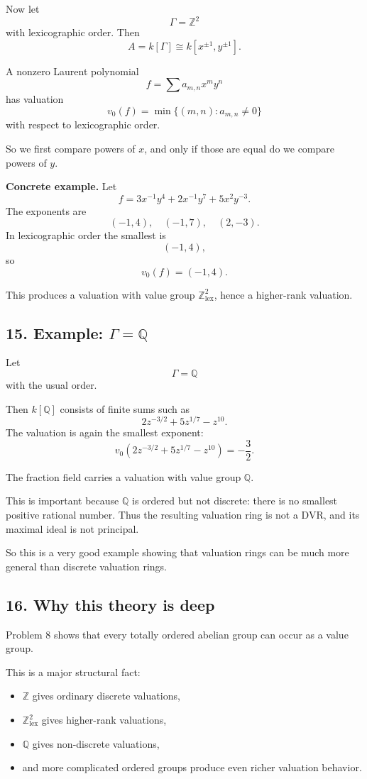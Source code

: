 \documentclass[12pt,a4paper]{article}
\theoremstyle{notespace}
\begin{document}
Now let
\[
\Gamma=\mathbb Z^2
\]
with lexicographic order. Then
\[
A=k[\Gamma]\cong k[x^{\pm1},y^{\pm1}].
\]

A nonzero Laurent polynomial
\[
f=\sum a_{m,n}x^m y^n
\]
has valuation
\[
v_0(f)=\min\{(m,n): a_{m,n}\neq 0\}
\]
with respect to lexicographic order.

So we first compare powers of \(x\), and only if those are equal do we compare powers of \(y\).

\textbf{Concrete example.}
Let
\[
f=3x^{-1}y^4 + 2x^{-1}y^7 + 5x^2y^{-3}.
\]
The exponents are
\[
(-1,4),\quad (-1,7),\quad (2,-3).
\]
In lexicographic order the smallest is
\[
(-1,4),
\]
so
\[
v_0(f)=(-1,4).
\]

This produces a valuation with value group \(\mathbb Z^2_{\mathrm{lex}}\), hence a higher-rank valuation.

\subsection{15. Example: \(\Gamma=\mathbb Q\)}

Let
\[
\Gamma=\mathbb Q
\]
with the usual order.

Then \(k[\mathbb Q]\) consists of finite sums such as
\[
2z^{-3/2}+5z^{1/7}-z^{10}.
\]
The valuation is again the smallest exponent:
\[
v_0\!\left(2z^{-3/2}+5z^{1/7}-z^{10}\right)=-\frac32.
\]

The fraction field carries a valuation with value group \(\mathbb Q\).

This is important because \(\mathbb Q\) is ordered but not discrete: there is no smallest positive rational number. Thus the resulting valuation ring is not a DVR, and its maximal ideal is not principal.

So this is a very good example showing that valuation rings can be much more general than discrete valuation rings.

\subsection{16. Why this theory is deep}

Problem 8 shows that every totally ordered abelian group can occur as a value group.

This is a major structural fact:
\begin{itemize}
	\item \(\mathbb Z\) gives ordinary discrete valuations,
	\item \(\mathbb Z^2_{\mathrm{lex}}\) gives higher-rank valuations,
	\item \(\mathbb Q\) gives non-discrete valuations,
	\item and more complicated ordered groups produce even richer valuation behavior.
\end{itemize}
\end{document}
